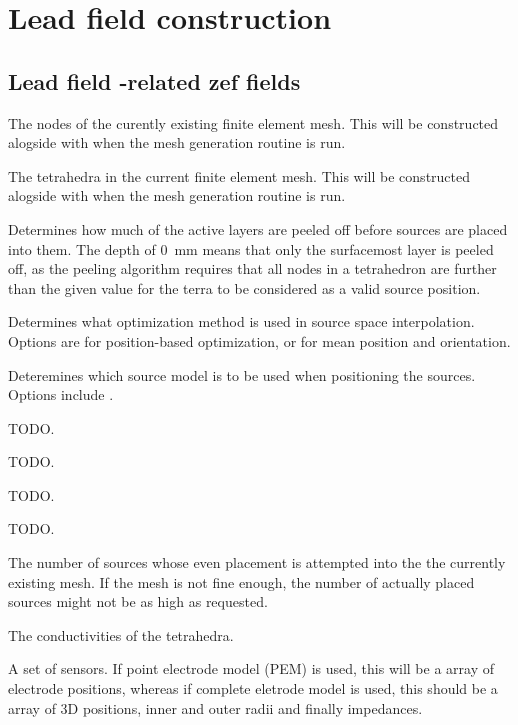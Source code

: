 \section{Lead field construction}\label{sec:lead-field-construction}

\subsection{Lead field -related zef fields}\label{ssec:meshing-fields}

 The nodes of the curently existing finite element mesh.
This will be constructed alogside with  when the mesh
generation routine is run.

 The tetrahedra in the current finite element mesh. This
will be constructed alogside with  when the mesh generation
routine is run.

 Determines how much of the active
layers are peeled off before sources are placed into them. The depth of
\SI{0}{\milli\meter} means that only the surfacemost layer is peeled off, as
the peeling algorithm requires that all nodes in a tetrahedron are further
than the given value for the terra to be considered as a valid source
position.

 Determines what optimization
method is used in source space interpolation. Options are  for
position-based optimization, or  for mean position and
orientation.

 Deteremines which source model is to be used
when positioning the sources. Options include .

 TODO.

 TODO.

 TODO.

 TODO.

 The number of sources whose even placement is
attempted into the the currently existing mesh. If the mesh is not fine
enough, the number of actually placed sources might not be as high as
requested.

 The conductivities of the tetrahedra.

 A set of sensors. If point electrode model (PEM) is
used, this will be a  array of electrode positions, whereas if
complete eletrode model is used, this should be a  array of 3D
positions, inner and outer radii and finally impedances.
